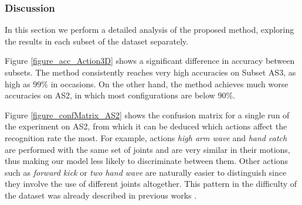 \documentclass{fcs}
\begin{document}
\begin{comment}
\doublerulesep 0.1pt
\begin{table}[h]
\begin{footnotesize}
\caption{Action sets for MSR Action3D} 
\label{action_sets}
\begin{tabular}{p{2cm}p{1cm}p{0.5cm}p{0.5cm}p{0.5cm}}
\hline\hline\noalign{\smallskip}
    Action & Sequences & AS1 & AS2 & AS3 \\
\noalign{\smallskip} \hline
    Tennis Swing & 20 & No & Yes & No\\
    Tennis Swing & 20 & No & Yes & No\\
    Tennis Swing & 20 & No & Yes & No\\
\hline\hline
\end{tabular}
\end{footnotesize}
\end{table}
\end{comment}

\subsubsection{Discussion}





In this section we perform a detailed analysis of the proposed method, exploring the results in each subset of the dataset separately.



Figure \ref{figure_acc_Action3D} shows a significant difference in accuracy between subsets. The method consistently reaches very high accuracies on Subset AS3, as high as $99\%$ in occasions. On the other hand, the method achieves much worse accuracies on AS2, in which most configurations are below $90\%$.

Figure \ref{figure_confMatrix_AS2} shows the confusion matrix for a single run of the experiment on AS2, from which it can be deduced which actions affect the recognition rate the most. For example, actions  \textit{high arm wave} and \textit{hand catch} are performed with the same set of joints and are very similar in their motions, thus making our model less likely to discriminate between them. Other actions such as \textit{forward kick} or \textit{two hand wave} are naturally easier to distinguish since they involve the use of different joints altogether. This pattern in the difficulty of the dataset was already described in previous works \cite{wang2012actionlet}\cite{wang2012robust}.
\end{document}
